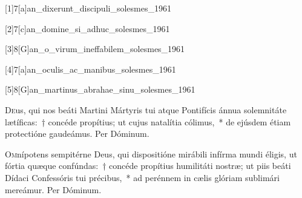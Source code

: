 \documentclass[vesperale_romanum]{subfiles}
\begin{document}

[1]{7}[a]{an_dixerunt_discipuli_solesmes_1961}

[2]{7}[c]{an_domine_si_adhuc_solesmes_1961}
\label{110_7c_nov}

[3]{8}[G]{an_o_virum_ineffabilem_solesmes_1961}

[4]{7}[a]{an_oculis_ac_manibus_solesmes_1961}
\label{112_7a_nov}

[5]{8}[G]{an_martinus_abrahae_sinu_solesmes_1961}



\commemoration

\myrule


\semiduplex


\oratio

\lettrine{D}{e}us, qui nos beáti Martini Mártyris tui atque Pontifícis ánnua solemnitáte lætíficas:~† concéde propítius; ut cujus natalítia cólimus,~* de ejúsdem étiam protectióne gaudeámus. Per Dóminum.

\capitdeseq

\myrule

\newpage


\semiduplex

\oratio

\lettrine{O}{m}nípotens sempitérne Deus, qui dispositióne mirábili infírma mundi éligis, ut fórtia quæque confúndas:~† concéde propítius humilitáti nostræ; ut piis beáti Dídaci Confessóris tui précibus,~* ad perénnem in cælis glóriam sublimári mereámur. Per Dóminum.

\end{document}
